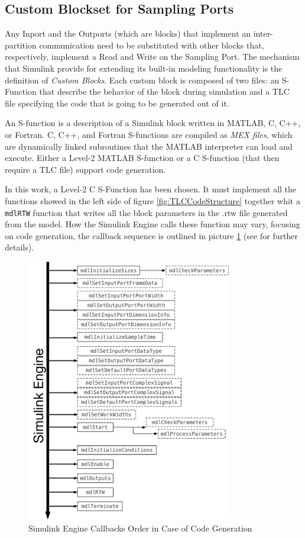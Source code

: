 \subsection{Custom Blockset for Sampling Ports}
Any Inport and the Outports (which are blocks) that implement an inter-partition communication need to be substituted with other blocks that, respectively, implement a Read and Write on the Sampling Port. The mechanism that Simulink provide for extending its built-in modeling functionality is the definition of \emph{Custom Blocks}. Each custom block is composed of two files: an S-Function that describe the behavior of the block during simulation and a TLC file specifying the code that is going to be generated out of it. %
\par An S-function is a description of a Simulink block written in MATLAB, C, C++, or Fortran. C, C++, and Fortran S-functions are compiled as \emph{MEX files}, which are dynamically linked subroutines that the MATLAB interpreter can load and execute. Either a Level-2 MATLAB S-function or a C S-function (that then require a TLC file) support code generation.
\par In this work, a Level-2 C S-Function has been chosen. It must implement all the functions showed in the left side of figure \ref{fig:TLCCodeStructure} together whit a \verb|mdlRTW| function that writes all the block parameters in the .rtw file generated from the model. How the Simulink Engine calls these function may vary, focusing on code generation, the callback sequence is outlined in picture \ref{fig:RTWCallbacks} (see \cite{SFunctions} for further details).
\begin{figure}[htbp] 
\centering    
\includegraphics[width=0.8\textwidth]{RTWCallbacks}
\caption{Simulink Engine Callbacks Order in Case of Code Generation}
\label{fig:RTWCallbacks}
\end{figure}
